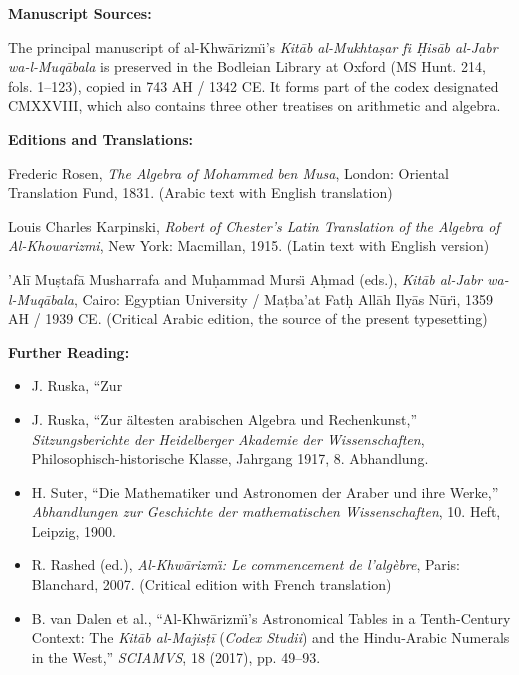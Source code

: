 \documentclass[11pt,a4paper]{book}
\begin{document}
\begin{small}
\textbf{Manuscript Sources:}

The principal manuscript of al-Khw\=arizm\"{\i}'s \textit{Kit\=ab al-Mukhta\d{s}ar
f\"{\i} \d{H}is\=ab al-Jabr wa-l-Muq\=abala} is preserved in the Bodleian
Library at Oxford (MS Hunt. 214, fols. 1--123), copied in 743 AH / 1342 CE.
It forms part of the codex designated CMXXVIII, which also contains three
other treatises on arithmetic and algebra.

\vspace{0.3cm}

\textbf{Editions and Translations:}

\begin{enumerate}[label={[\arabic*]},leftmargin=2em]
  \item Frederic Rosen, \textit{The Algebra of Mohammed ben Musa}, London:
  Oriental Translation Fund, 1831. (Arabic text with English translation)
  
  \item Louis Charles Karpinski, \textit{Robert of Chester's Latin
  Translation of the Algebra of Al-Khowarizmi}, New York: Macmillan, 1915.
  (Latin text with English version)
  
  \item 'Al\=i Mu\d{s}taf\=a Musharrafa and Mu\d{h}ammad Murs\"{\i} A\d{h}mad
  (eds.), \textit{Kit\=ab al-Jabr wa-l-Muq\=abala}, Cairo: Egyptian
  University / Ma\d{t}ba'at Fat\d{h} All\=ah Ily\=as N\=ur\"{\i}, 1359 AH /
  1939 CE. (Critical Arabic edition, the source of the present typesetting)
\end{enumerate}

\vspace{0.3cm}

\textbf{Further Reading:}

\begin{itemize}[leftmargin=2em]
  \item J. Ruska, ``Zur \  \item J. Ruska, ``Zur {\"a}ltesten arabischen Algebra und Rechenkunst,''
  \textit{Sitzungsberichte der Heidelberger Akademie der Wissenschaften},
  Philosophisch-historische Klasse, Jahrgang 1917, 8. Abhandlung.
  
  \item H. Suter, ``Die Mathematiker und Astronomen der Araber und ihre
  Werke,'' \textit{Abhandlungen zur Geschichte der mathematischen
  Wissenschaften}, 10. Heft, Leipzig, 1900.
  
  \item R. Rashed (ed.), \textit{Al-Khw\=arizm\"{\i}: Le commencement de
  l'alg\`ebre}, Paris: Blanchard, 2007. (Critical edition with French
  translation)
  
  \item B. van Dalen et al., ``Al-Khw\=arizm\"{\i}'s Astronomical Tables in
  a Tenth-Century Context: The \textit{Kit\=ab al-Majis\d{t}\=i}
  (\textit{Codex Studii}) and the Hindu-Arabic Numerals in the West,''
  \textit{SCIAMVS}, 18 (2017), pp. 49--93.
\end{itemize}
\end{small}
\end{document}
